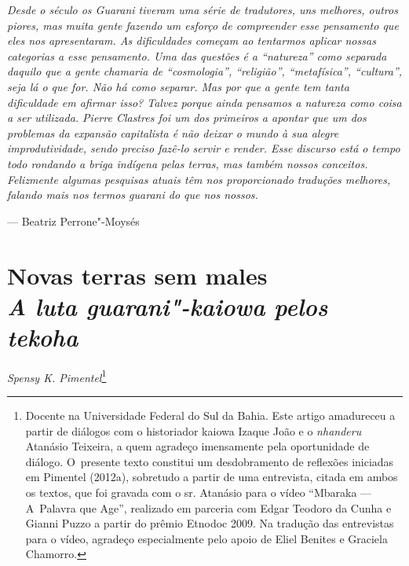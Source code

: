 \begin{flushright}
\begin{minipage}[c]{0.85\textwidth}
\raggedleft
\footnotesize
\emph{Desde o século  os Guarani tiveram uma série de tradutores, uns
melhores, outros piores, mas muita gente fazendo um esforço de
compreender esse pensamento que eles nos apresentaram. As dificuldades
começam ao tentarmos aplicar nossas categorias a esse pensamento. Uma
das questões é a ``natureza'' como separada daquilo que a gente chamaria de
``cosmologia'', ``religião'', ``metafísica'', ``cultura'', seja lá o que for. Não há
como separar. Mas por que a gente tem tanta dificuldade em afirmar
isso? Talvez porque ainda pensamos a natureza como coisa a ser
utilizada. Pierre Clastres foi um dos primeiros a apontar que um dos
problemas da expansão capitalista é não deixar o mundo à sua alegre
improdutividade, sendo preciso fazê-lo servir e render. Esse discurso
está o tempo todo rondando a briga indígena pelas terras, mas também
nossos conceitos. Felizmente algumas pesquisas atuais têm nos
proporcionado traduções melhores, falando mais nos termos guarani do
que nos nossos.}

\smallskip
\hspace*{\fill}--- Beatriz Perrone"-Moysés
\end{minipage}
\end{flushright}

\thispagestyle{empty}

\chapter*{Novas terras sem males\\
\large{\emph{A luta guarani"-kaiowa pelos \emph{tekoha}}}}


\begin{flushright}
\emph{Spensy K. Pimentel}\footnote{Docente na Universidade Federal do Sul da
Bahia. Este artigo amadureceu a partir de diálogos com o historiador
kaiowa Izaque João e o \emph{nhanderu} Atanásio Teixeira, a quem agradeço
imensamente pela oportunidade de diálogo. O~presente texto constitui um
desdobramento de reflexões iniciadas em Pimentel (2012a), sobretudo a
partir de uma entrevista, citada em ambos os textos, que foi gravada
com o sr. Atanásio para o vídeo ``Mbaraka --- A~Palavra que Age'',
realizado em parceria com Edgar Teodoro da Cunha e Gianni Puzzo a
partir do prêmio Etnodoc 2009. Na tradução das entrevistas para o
vídeo, agradeço especialmente pelo apoio de Eliel Benites e Graciela
Chamorro.} 
\end{flushright}


